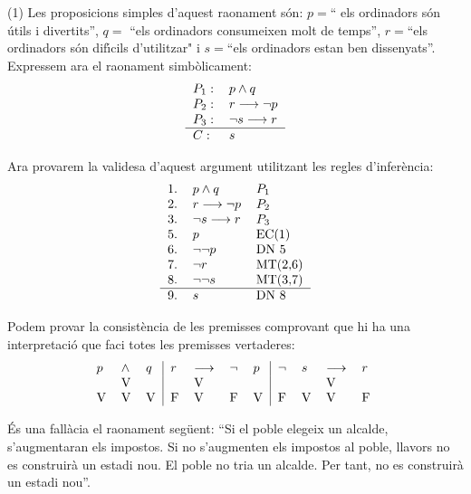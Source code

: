 \begin{solucio}
(1) Les proposicions simples d'aquest raonament s\'{o}n: $p=$\textquotedblleft
els ordinadors s\'{o}n \'{u}tils i divertits\textquotedblright, $q=$%
\textquotedblleft els ordinadors consumeixen molt de temps\textquotedblright,
$r=$\textquotedblleft els ordinadors s\'{o}n dif\'{\i}cils d'utilitzar" i
$s=$\textquotedblleft els ordinadors estan ben dissenyats\textquotedblright.
Expressem ara el raonament simb\`{o}licament:%
\[%
\begin{tabular}
[c]{ll}%
$P_{1}:$ & $p\wedge q$\\
$P_{2}:$ & $r\longrightarrow\lnot p$\\
$P_{3}:$ & $\lnot s\longrightarrow r$\\\hline
$C:$ & $s$%
\end{tabular}
\]


Ara provarem la validesa d'aquest argument utilitzant les regles
d'infer\`{e}ncia:%
\[%
\begin{tabular}
[c]{lll}%
1. & $p\wedge q$ & $P_{1}$\\
2. & $r\longrightarrow\lnot p$ & $P_{2}$\\
3. & $\lnot s\longrightarrow r$ & $P_{3}$\\
5. & $p$ & EC(1)\\
6. & $\lnot\lnot p$ & DN 5\\
7. & $\lnot r$ & MT(2,6)\\
8. & $\lnot\lnot s$ & MT(3,7)\\\hline
9. & $s$ & DN 8
\end{tabular}
\]


Podem provar la consist\`{e}ncia de les premisses comprovant que hi ha una
interpretaci\'{o} que faci totes les premisses vertaderes:%
\[%
\begin{tabular}
[c]{lll|llll|llll}%
$p$ & $\wedge$ & $q$ & $r$ & $\longrightarrow$ & $\lnot$ & $p$ & $\lnot$ & $s$
& $\longrightarrow$ & $r$\\
& V &  &  & V &  &  &  &  & V & \\
V & V & V & F & V & F & V & F & V & V & F
\end{tabular}
\
\]

\end{solucio}

\begin{exercici}
\'{E}s una fal\textperiodcentered l\`{a}cia el raonament seg\"{u}ent:
\textquotedblleft Si el poble elegeix un alcalde, s'augmentaran els impostos.
Si no s'augmenten els impostos al poble, llavors no es construir\`{a} un
estadi nou. El poble no tria un alcalde. Per tant, no es construir\`{a} un
estadi nou\textquotedblright.
\end{exercici}


